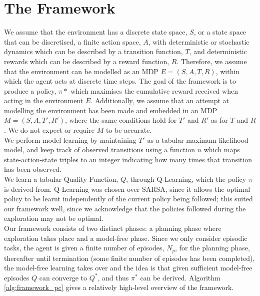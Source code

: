 \section{The Framework}
We assume that the environment has a discrete state space, $S$, or a state space that can be discretised, a finite action space, $A$, with deterministic or stochastic dynamics which can be described by a transition function, $T$, and deterministic rewards which can be described by a reward function, $R$. Therefore, we assume that the environment can be modelled as an MDP $E = (S, A, T, R)$, within which the agent acts at discrete time steps. The goal of the framework is to produce a policy, $\pi*$ which maximises the cumulative reward received when acting in the environment $E$.
Additionally, we assume that an attempt at modelling the environment has been made and embedded in an MDP $M = (S, A, T', R')$, where the same conditions hold for $T'$ and $R'$ as for $T$ and $R$. We do not expect or require $M$ to be accurate. 
\\We perform model-learning by maintaining $T'$ as a tabular maximum-likelihood model, and keep track of observed transitions using a function $n$ which maps state-action-state triples to an integer indicating how many times that transition has been observed.
\\We learn a tabular Quality Function, $Q$, through Q-Learning, which the policy $\pi$ is derived from. Q-Learning was chosen over SARSA, since it allows the optimal policy to be learnt independently of the current policy being followed; this suited our framework well, since we acknowledge that the policies followed during the exploration may not be optimal.
\\Our framework consists of two distinct phases: a planning phase where exploration takes place and a model-free phase. Since we only consider episodic tasks, the agent is given a finite number of episodes, $N_p$, for the planning phase, thereafter until termination (some finite number of episodes has been completed), the model-free learning takes over and the idea is that given sufficient model-free episodes $Q$ can converge to $Q^*$, and thus $\pi^*$ can be derived. Algorithm \ref{alg:framework_pc} gives a relatively high-level overview of the framework.

